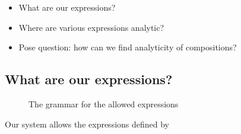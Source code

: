 
\begin{itemize}
  \item What are our expressions?
  \item Where are various expressions analytic?
  \item Pose question: how can we find analyticity of compositions?
\end{itemize}

\subsection{What are our expressions?}
\begin{figure}[H]
	
	\label{fig:grammar}
	\caption{The grammar for the allowed expressions}
\end{figure}

Our system allows the expressions defined by \
